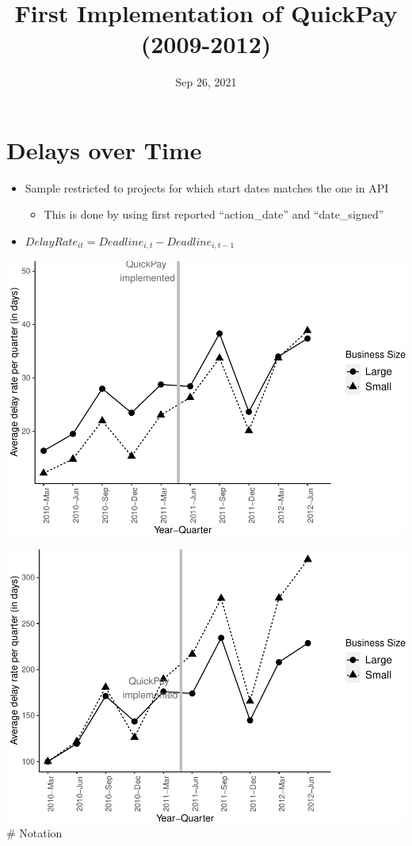 \documentclass[
]{article}
\title{First Implementation of QuickPay (2009-2012)}
\author{}
\date{\vspace{-2.5em}Sep 26, 2021}
\providecommand{\tightlist}{%
  \setlength{\itemsep}{0pt}\setlength{\parskip}{0pt}}
\begin{document}
\maketitle

\hypertarget{delays-over-time}{%
\section{Delays over Time}\label{delays-over-time}}

\begin{itemize}
\tightlist
\item
  Sample restricted to projects for which start dates matches the one in
  API

  \begin{itemize}
  \tightlist
  \item
    This is done by using first reported ``action\_date'' and
    ``date\_signed''
  \end{itemize}
\item
  \(DelayRate_{it}=Deadline_{i,t} - Deadline_{i,t-1}\)
\end{itemize}

\includegraphics{qp_first_implementation_files/figure-latex/plot-1.pdf}

\includegraphics{qp_first_implementation_files/figure-latex/normalized_plot-1.pdf}
\# Notation
\end{document}
